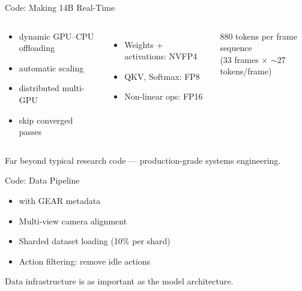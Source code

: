 \begin{frame}{Code: Making 14B Real-Time}
\begin{columns}[T]
\begin{methodbox}
\begin{itemize}
    \item {} dynamic GPU--CPU offloading
    \item {} automatic scaling
    \item {} distributed multi-GPU
    \item {} skip converged passes
\end{itemize}
\end{methodbox}

\begin{itemize}
    \item Weights + activations: NVFP4
    \item QKV, Softmax: FP8
    \item Non-linear ops: FP16
\end{itemize}

\vspace{0.3em}
{\small 880 tokens per frame sequence\\
(33 frames $\times$ $\sim$27 tokens/frame)}
\end{columns}

\vspace{0.3em}
\begin{softbox}
 Far beyond typical
research code --- production-grade systems engineering.
\end{softbox}
\end{frame}

\begin{frame}{Code: Data Pipeline}
\begin{methodbox}
\begin{itemize}
    \item {} with GEAR metadata
    \item Multi-view camera alignment
    \item Sharded dataset loading (10\% per shard)
    \item Action filtering: remove idle actions
\end{itemize}
\end{methodbox}

\vspace{0.5em}
\begin{softbox}
 Data infrastructure is
as important as the model architecture.
\end{softbox}
\end{frame}

